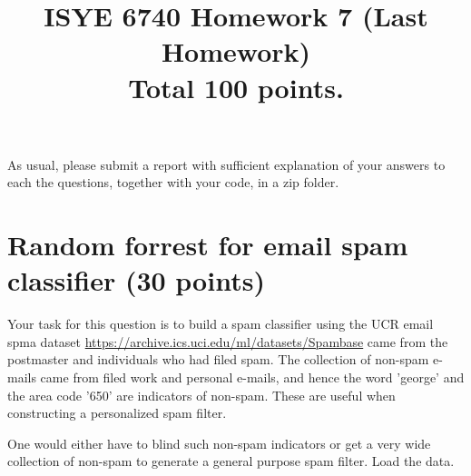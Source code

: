 \documentclass[twoside,10pt]{article}
\begin{document}
\title{ISYE 6740 Homework 7 (Last Homework)\\ 
\small Total 100 points.}
\date{}
\maketitle



As usual, please submit a report with sufficient explanation of your answers to each the questions, together with your code, in a zip folder.



\section{Random forrest for email spam classifier (30 points)}

Your task for this question is to build a spam classifier using the UCR email spma dataset \url{https://archive.ics.uci.edu/ml/datasets/Spambase} came from the postmaster and individuals who had filed spam. The collection of non-spam e-mails came from filed work and personal e-mails, and hence the word \textsf{'george'} and the area code \textsf{'650'} are indicators of non-spam. These are useful when constructing a personalized spam filter. 

One would either have to blind such non-spam indicators or get a very wide collection of non-spam to generate a general purpose spam filter. Load the data. %
\end{document}
